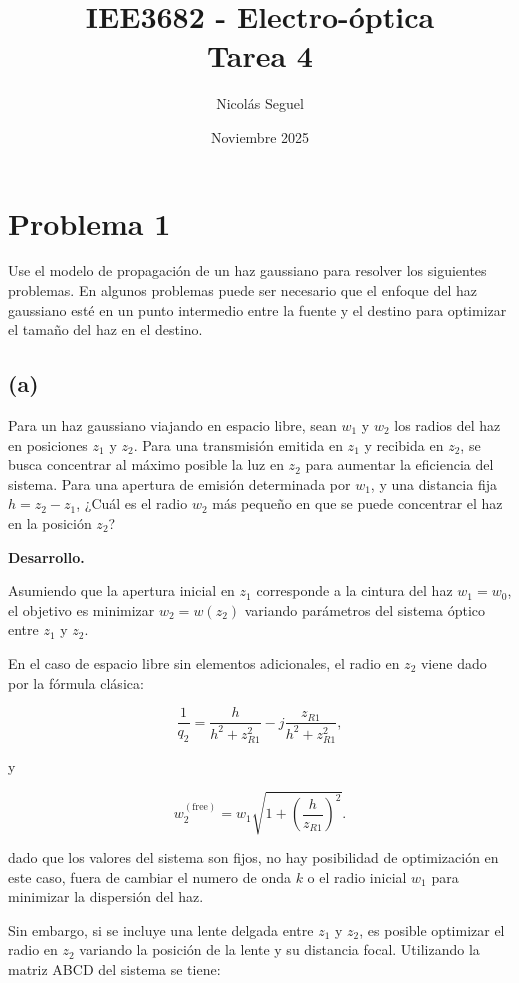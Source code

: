 \documentclass[11pt]{article}
\title{IEE3682 - Electro-óptica \\ Tarea 4}
\author{Nicolás Seguel}
\date{Noviembre 2025}
\begin{document}
\maketitle

\section*{Problema 1}
\noindent Use el modelo de propagación de un haz gaussiano para resolver los siguientes problemas. En algunos problemas puede ser necesario que el enfoque del haz gaussiano esté en un punto intermedio entre la fuente y el destino para optimizar el tamaño del haz en el destino.

\subsection*{(a)}
\noindent Para un haz gaussiano viajando en espacio libre, sean \(w_1\) y \(w_2\) los radios del haz en posiciones \(z_1\) y \(z_2\). Para una transmisión emitida en \(z_1\) y recibida en \(z_2\), se busca concentrar al máximo posible la luz en \(z_2\) para aumentar la eficiencia del sistema. Para una apertura de emisión determinada por \(w_1\), y una distancia fija \(h = z_2 - z_1\), ¿Cuál es el radio \(w_2\) más pequeño en que se puede concentrar el haz en la posición \(z_2\)?

\vspace{0.5em}
\noindent\textbf{Desarrollo.}

Asumiendo que la apertura inicial en \(z_1\) corresponde a la cintura del haz \(w_1 = w_0\), el objetivo es minimizar \(w_2 = w(z_2)\) variando parámetros del sistema óptico entre \(z_1\) y \(z_2\).

En el caso de espacio libre sin elementos adicionales, el radio en \(z_2\) viene dado por la fórmula clásica:

\[
\frac{1}{q_2} = \frac{h}{h^2 + z_{R1}^2} - j \frac{z_{R1}}{h^2 + z_{R1}^2},
\]

y 

\[
w_2^{(\mathrm{free})} = w_1\sqrt{1 + \left(\frac{h}{z_{R1}}\right)^2 }.
\]

dado que los valores del sistema son fijos, no hay posibilidad de optimización en este caso, fuera de cambiar el numero de onda \(k\) o el radio inicial \(w_1\) para minimizar la dispersión del haz.

Sin embargo, si se incluye una lente delgada entre \(z_1\) y \(z_2\), es posible optimizar el radio en \(z_2\) variando la posición de la lente y su distancia focal. Utilizando la matriz ABCD del sistema se tiene:
\end{document}
